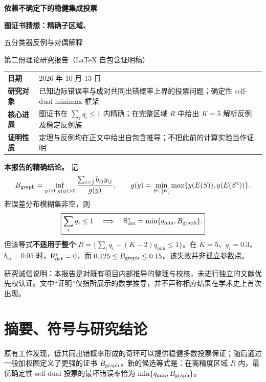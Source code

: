 \documentclass[11pt,a4paper]{ctexart}
\theoremstyle{definition}
\newcommand{\Risk}{\mathsf R}
\begin{document}
\thispagestyle{empty}
\vspace*{1.5cm}
\noindent{\color{accent}\rule{\textwidth}{1.7pt}}\par
\vspace{0.8cm}
{\Huge\bfseries 依赖不确定下的稳健集成投票}\par
\vspace{0.38cm}
{\LARGE\bfseries 图证书猜想：精确子区域、\par\vspace{0.12cm}五分类器反例与对偶解释}\par
\vspace{0.8cm}
{\Large 第二份理论研究报告（LaTeX 自包含证明稿）}\par
\vspace{0.8cm}
\noindent\begin{tabularx}{\textwidth}{@{}p{29mm}X@{}}
\textbf{日期} & 2026 年 10 月 13 日 \\
\textbf{研究对象} & 已知边际错误率与成对共同出错概率上界的投票问题；\newline 确定性 self-dual minimax 框架 \\
\textbf{核心进展} & 图证书在 $\sum_iq_i\le1$ 内精确；\newline 在完整区域 $R$ 中给出 $K=5$ 解析反例及稳定反例族 \\
\textbf{证明性质} & 定理与反例均在正文中给出自包含推导；不把此前的计算实验当作证明 \\
\end{tabularx}
\vfill
\begin{resultbox}
\textbf{本报告的精确结论。} 记
\[
B_{\rm graph}=\inf_{y\ge0:\,g(y)>0}\frac{\sum_{i<j}b_{ij}y_{ij}}{g(y)},\qquad
 g(y)=\min_{S\subseteq[K]}\max\{y(E(S)),y(E(S^c))\}.
\]
若误差分布模糊集非空，则
\[
\boxed{\sum_iq_i\le1\quad\Longrightarrow\quad
\Risk^*_{\rm det}=\min\{q_{\min},B_{\rm graph}\}.}
\]
但该等式\textbf{不适用于整个} $R=\{\sum_iq_i-(K-2)q_{\min}\le1\}$。在 $K=5$、$q_i=0.3$、$b_{ij}=0.05$ 时，$\Risk^*_{\rm det}=0$，而 $0.125\le B_{\rm graph}\le0.15$。该失败并非孤立参数点。
\end{resultbox}
\vspace{0.4cm}
{\small\color{gray} 研究诚信说明：本报告是对既有项目内部推导的整理与校核，未进行独立的文献优先权认证。文中“证明”仅指所展示的数学推导，并不声称相应结果在学术史上首次出现。}
\newpage
\tableofcontents
\newpage

\section{摘要、符号与研究结论}
原有工作发现，低共同出错概率形成的奇环可以提供稳健多数投票保证；随后通过一般加权图定义了更强的证书 $B_{\rm graph}$。新的候选等式是：在高精度区域 $R$ 内，最优确定性 self-dual 投票的最坏错误率恰为 $\min\{q_{\min},B_{\rm graph}\}$。
\end{document}
